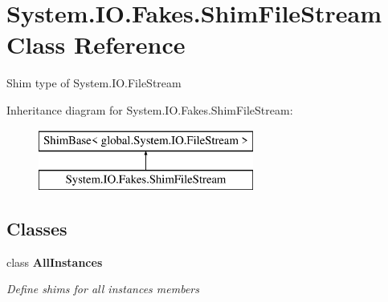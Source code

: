 \hypertarget{class_system_1_1_i_o_1_1_fakes_1_1_shim_file_stream}{\section{System.\-I\-O.\-Fakes.\-Shim\-File\-Stream Class Reference}
\label{class_system_1_1_i_o_1_1_fakes_1_1_shim_file_stream}
}


Shim type of System.\-I\-O.\-File\-Stream 


Inheritance diagram for System.\-I\-O.\-Fakes.\-Shim\-File\-Stream\-:\begin{figure}[H]
\begin{center}
\leavevmode
\includegraphics[height=2.000000cm]{class_system_1_1_i_o_1_1_fakes_1_1_shim_file_stream}
\end{center}
\end{figure}
\subsection*{Classes}
\begin{DoxyCompactItemize}
\item 
class {\bfseries All\-Instances}
\begin{DoxyCompactList}\small\item\em Define shims for all instances members\end{DoxyCompactList}\end{DoxyCompactItemize}
